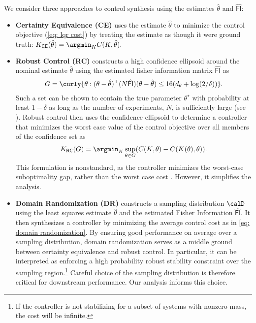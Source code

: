 We consider three approaches to control synthesis using the estimates $\hat\theta$ and $\hat{\mathsf{FI}}$:
\begin{itemize}[noitemsep, nolistsep, leftmargin=*]
    \item \textbf{Certainty Equivalence (CE)} uses the estimate $\hat{\theta}$ to minimize the control objective (\ref{eq: lqr cost}) by treating the estimate as though it were ground truth: 
        $K_{\mathsf{CE}}(\hat \theta) = \argmin_{K} C(K,\hat\theta).$
    \item \textbf{Robust Control (RC)} constructs a high confidence ellipsoid around the nominal estimate $\hat\theta$ using the estimated fisher information matrix $\hat{\mathsf{FI}}$ as
    \begin{align}
        \label{eq: confidence ellipsoid}
        G = \curly{\theta: (\theta-\hat\theta)^\top (N\hat {\mathsf{FI}}) (\theta- \hat \theta) \leq 16 (d_{\theta} +  \log(2/\delta))}.
    \end{align}
    Such a set can be shown to contain the true parameter $\theta^\star$ with probability at least $1-\delta$ as long as the number of experiments, $N$, is sufficiently large (see ). 
    Robust control then uses the confidence ellipsoid to determine a controller that minimizes the worst case  value of the control objective over all members of the confidence set as
    \begin{align*}
        {K}_{\mathsf{RC}}(G) = \argmin_{K}\sup_{\theta\in G}(C(K, {\theta}) - C(K(\theta), {\theta})).
    \end{align*}
    This formulation is nonstandard, as the controller minimizes the worst-case suboptimality gap, rather than the worst case cost \citep{gevers2005identification}. However, it simplifies the analysis. 
    \item \textbf{Domain Randomization (DR)} constructs a sampling distribution $\calD$ using the least squares estimate $\hat \theta$ and the estimated Fisher Information $\hat{\mathsf{FI}}$. It then synthesizes a controller by minimizing the average control cost as in \eqref{eq: domain randomization}. By ensuring good performance on average over a sampling distribution, domain randomization serves as a middle ground between certainty equivalence and robust control. In particular, it can be interpreted as enforcing a high probability robust stability constraint over the sampling region.\footnote{If the controller is not stabilizing for a subset of systems with nonzero mass, the cost will be infinite.} Careful choice of the sampling distribution is therefore critical for downstream performance. Our analysis informs this choice. %
\end{itemize}

